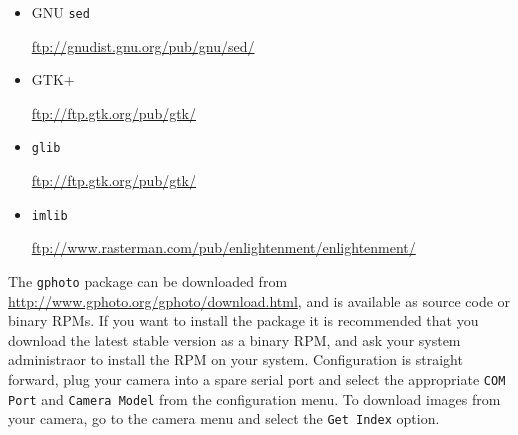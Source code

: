 \documentclass[twoside,11pt]{starlink}
\begin{document}
\begin{itemize}
\item {GNU \texttt{sed}}\\
\begin{small}\url{ftp://gnudist.gnu.org/pub/gnu/sed/}\end{small}
\item {GTK+}\\
\begin{small}\url{ftp://ftp.gtk.org/pub/gtk/}\end{small}
\item {\texttt{glib}}\\
\begin{small}\url{ftp://ftp.gtk.org/pub/gtk/}\end{small}
\item {\texttt{imlib}}\\
\begin{small}\url{ftp://www.rasterman.com/pub/enlightenment/enlightenment/}\end{small}
\end{itemize}


The \texttt{gphoto} package can be downloaded from \url{http://www.gphoto.org/gphoto/download.html}, and is available as source code or binary RPMs. If you want to install the package it is recommended that you download the latest stable version as a binary RPM, and ask your system administraor to install the RPM on your system. Configuration is straight forward, plug your camera into a spare serial port and select the appropriate \texttt{COM Port} and \texttt{Camera Model} from the configuration menu. To download images from your camera, go to the camera menu and select the \texttt{Get Index} option.



\end{document}
